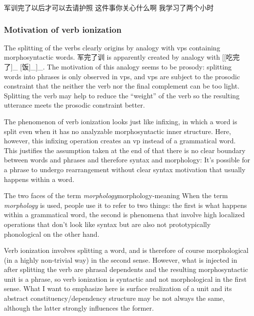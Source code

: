 \documentclass[UTF8, a4paper, oneside, scheme=plain, 12pt]{ctexrep}
\newcommand*{\term}[1]{\emph{#1}}
\begin{document}
\begin{exe}
    \ex\label{ex:verb-phrase.separation.junxun-2} 军训完了以后才可以去请护照
    \ex\label{ex:verb-phrase.separation.guanxin-2} 这件事你关心什么啊
    \ex\label{ex:verb-phrase.separation.xuexi-2} 我学习了两个小时
\end{exe}

\subsubsection{Motivation of verb ionization}

The splitting of the verbs clearly origins 
by analogy with \ac{vp}s containing morphosyntactic words.
军完了训 is apparently created by analogy with 
[[吃完了]_{} [饭]_{}]_{}.
The motivation of this analogy seems to be prosody: 
splitting words into phrases is only observed in \ac{vp}s,
and \ac{vp}s are subject to the prosodic constraint 
that the neither the verb nor the final complement can be too light.
Splitting the verb may help to reduce the ``weight'' of the verb 
so the resulting utterance meets the prosodic constraint better.

The phenomenon of verb ionization
looks just like infixing,
in which a word is split even when it has no analyzable morphosyntactic inner structure.
Here, however, this infixing operation creates an \acs{vp} instead of a grammatical word.
This justifies the assumption taken at the end of 
that there is no clear boundary between words and phrases 
and therefore syntax and morphology:
It's possible for a phrase to undergo 
rearrangement without clear syntax motivation
that usually happens within a word.

\begin{theorybox}{The two faces of the term \term{morphology}}{morphology-meaning}
    When the term \term{morphology} is used, 
    people use it to refer to two things:
    the first is what happens within a grammatical word, 
    the second is phenomena that involve high localized
    operations that don't look like syntax 
    but are also not prototypically phonological on the other hand. 
    
    Verb ionization involves 
    splitting a word,
    and is therefore of course morphological (in a highly non-trivial way)
    in the second sense.
    However, what is injected in after splitting the verb are phrasal dependents 
    and the resulting morphosyntactic unit is a phrase,
    so verb ionization is syntactic and not morphological in the first sense.
    What I want to emphasize here is surface realization of a unit 
    and its abstract constituency/dependency structure
    may be not always the same, 
    although the latter strongly influences the former.
\end{theorybox}
\end{document}
